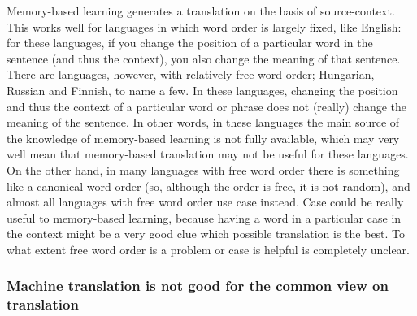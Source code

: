 \documentclass[12pt]{article}
\begin{document}
Memory-based learning generates a translation on the basis of source-context. This works well for languages in which word order is largely fixed, like English: for these languages, if you change the position of a particular word in the sentence (and thus the context), you also change the meaning of that sentence. There are languages, however, with relatively free word order; Hungarian, Russian and Finnish, to name a few. In these languages, changing the position and thus the context of a particular word or phrase does not (really) change the meaning of the sentence. In other words, in these languages the main source of the knowledge of memory-based learning is not fully available, which may very well mean that memory-based translation may not be useful for these languages. On the other hand, in many languages with free word order there is something like a canonical word order (so, although the order is free, it is not random), and almost all languages with free word order use case instead. Case could be really useful to memory-based learning, because having a word in a particular case in the context might be a very good clue which possible translation is the best. To what extent free word order is a problem or case is helpful is completely unclear.
\\\indent

\subsubsection{Machine translation is not good for the common view on translation}
\end{document}

